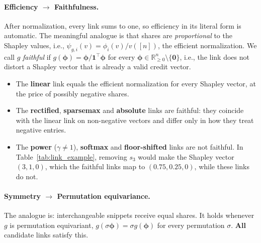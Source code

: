 \paragraph{Efficiency $\to$ Faithfulness.}
After normalization, every link sums to one, so efficiency in its literal form is automatic. The meaningful analogue is that shares are \emph{proportional} to the Shapley values, i.e., $\psi_{g,i}(v) = \phi_i(v) / v([n])$, the efficient normalization. We call $g$ \emph{faithful} if $g(\boldsymbol{\phi}) = \boldsymbol{\phi} / \mathbf{1}^\top \boldsymbol{\phi}$ for every $\boldsymbol{\phi} \in \mathbb{R}^n_{\ge 0} \setminus \{\mathbf{0}\}$, i.e., the link does not distort a Shapley vector that is already a valid credit vector.
\begin{itemize}
    \item The \textbf{linear} link equals the efficient normalization for every Shapley vector, at the price of possibly negative shares.
    \item The \textbf{rectified}, \textbf{sparsemax} and \textbf{absolute} links are faithful: they coincide with the linear link on non-negative vectors and differ only in how they treat negative entries.
    \item The \textbf{power} ($\gamma \neq 1$), \textbf{softmax} and \textbf{floor-shifted} links are not faithful. In Table~\ref{tab:link_example}, removing $s_3$ would make the Shapley vector $(3, 1, 0)$, which the faithful links map to $(0.75, 0.25, 0)$, while these links do not.
\end{itemize}

\paragraph{Symmetry $\to$ Permutation equivariance.}
The analogue is: interchangeable snippets receive equal shares. It holds whenever $g$ is permutation equivariant, $g(\sigma \boldsymbol{\phi}) = \sigma g(\boldsymbol{\phi})$ for every permutation $\sigma$. \textbf{All} candidate links satisfy this.

